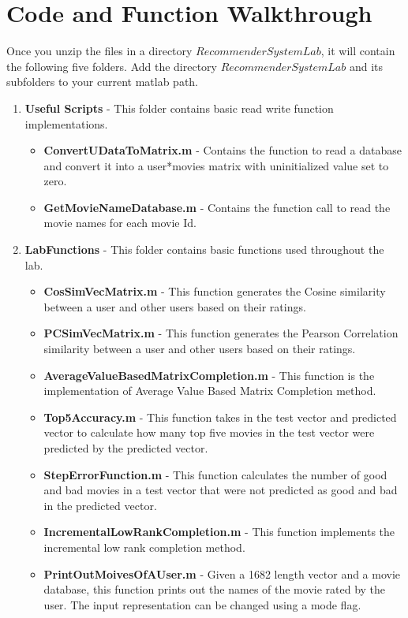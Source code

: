 \section{Code and Function Walkthrough}
Once you unzip the files in a directory $RecommenderSystemLab$, it will contain the following five folders. Add the directory $RecommenderSystemLab$ and its subfolders to your current matlab path.
\begin{enumerate}
\item \textbf{Useful Scripts} - This folder contains basic read write function implementations.
\begin{itemize}
\item \textbf{ConvertUDataToMatrix.m} - Contains the function to read a database and convert it into a user*movies matrix with uninitialized value set to zero.
\item \textbf{GetMovieNameDatabase.m} - Contains the function call to read the movie names for each movie Id.
\end{itemize}
\item \textbf{LabFunctions} - This folder contains basic functions used throughout the lab.
\begin{itemize}
\item \textbf{CosSimVecMatrix.m} - This function generates the Cosine similarity between a user and other users based on their ratings.
\item \textbf{PCSimVecMatrix.m} - This function generates the Pearson Correlation similarity between a user and other users based on their ratings.
\item \textbf{AverageValueBasedMatrixCompletion.m} - This function is the implementation of Average Value Based Matrix Completion method.
\item \textbf{Top5Accuracy.m} - This function takes in the test vector and predicted vector to calculate how many top five movies in the test vector were predicted by the predicted vector.
\item \textbf{StepErrorFunction.m} - This function calculates the number of good and bad movies in a test vector that were not predicted as good and bad in the predicted vector.
\item \textbf{IncrementalLowRankCompletion.m} - This function implements the incremental low rank completion method.
\item \textbf{PrintOutMoivesOfAUser.m} - Given a 1682 length vector and a movie database, this function prints out the names of the movie rated by the user. The input representation can be changed using a mode flag.

\end{itemize}
\end{enumerate}
